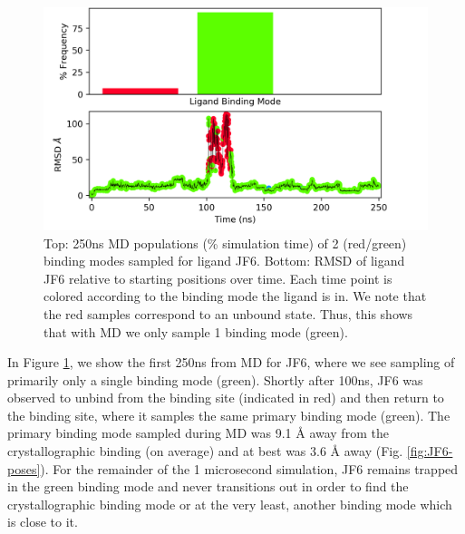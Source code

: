 \begin{figure}
    \centering
    \includegraphics{chapter6/Figures/JF6_c4-prod00.png}
    \caption[JF6 MD Populations]{Top: 250ns MD populations (\% simulation time) of 2 (red/green) binding modes sampled for ligand JF6. Bottom: RMSD of ligand JF6 relative to starting positions over time. Each time point is colored according to the binding mode the ligand is in. We note that the red samples correspond to an unbound state. Thus, this shows that with MD we only sample 1 binding mode (green).}
    \label{fig:JF6_c4-md}
\end{figure}

In Figure \ref{fig:JF6_c4-md}, we show the first 250ns from MD for JF6, where we see sampling of primarily only a single binding mode (green).
Shortly after 100ns, JF6 was observed to unbind from the binding site (indicated in red) and then return to the binding site, where it samples the same primary binding mode (green).
The primary binding mode sampled during MD was 9.1 {\AA} away from the crystallographic binding (on average) and at best was 3.6 {\AA} away (Fig. \ref{fig:JF6-poses}).
For the remainder of the 1 microsecond simulation, JF6 remains trapped in the green binding mode and never transitions out in order to find the crystallographic binding mode or at the very least, another binding mode which is close to it.

